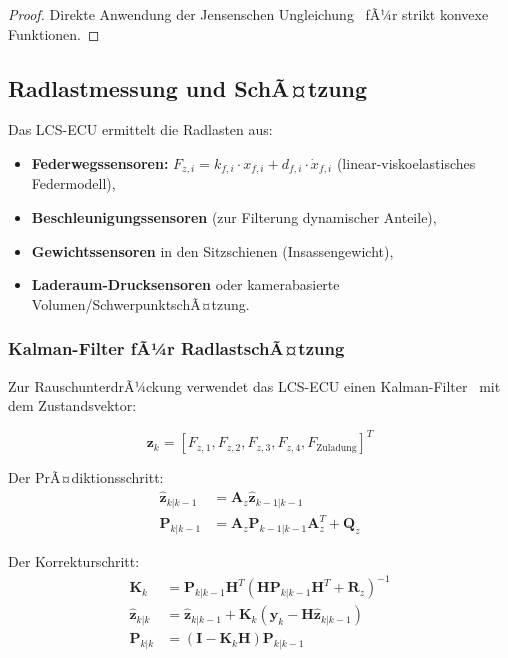 ﻿\documentclass[12pt,a4paper]{article}
\theoremstyle{definition}
\theoremstyle{remark}
\begin{document}
\begin{proof}
Direkte Anwendung der Jensenschen Ungleichung~\cite{Jensen1906} fÃ¼r strikt
konvexe Funktionen.
\end{proof}

\subsection{Radlastmessung und SchÃ¤tzung}

Das LCS-ECU ermittelt die Radlasten aus:
\begin{itemize}
  \item \textbf{Federwegssensoren:} $F_{z,i} = k_{f,i} \cdot x_{f,i} + d_{f,i} \cdot \dot{x}_{f,i}$
        (linear-viskoelastisches Federmodell),
  \item \textbf{Beschleunigungssensoren} (zur Filterung dynamischer Anteile),
  \item \textbf{Gewichtssensoren} in den Sitzschienen (Insassengewicht),
  \item \textbf{Laderaum-Drucksensoren} oder kamerabasierte Volumen/SchwerpunktschÃ¤tzung.
\end{itemize}

\subsubsection{Kalman-Filter fÃ¼r RadlastschÃ¤tzung}

Zur RauschunterdrÃ¼ckung verwendet das LCS-ECU einen Kalman-Filter~\cite{Kalman1960}
mit dem Zustandsvektor:

\begin{equation}
  \mathbf{z}_k = \left[F_{z,1}, F_{z,2}, F_{z,3}, F_{z,4}, F_{\mathrm{Zuladung}}\right]^T
\end{equation}

Der PrÃ¤diktionsschritt:
\begin{align}
  \hat{\mathbf{z}}_{k|k-1} &= \mathbf{A}_z \hat{\mathbf{z}}_{k-1|k-1}\\
  \mathbf{P}_{k|k-1} &= \mathbf{A}_z \mathbf{P}_{k-1|k-1} \mathbf{A}_z^T + \mathbf{Q}_z
\end{align}

Der Korrekturschritt:
\begin{align}
  \mathbf{K}_k &= \mathbf{P}_{k|k-1}\mathbf{H}^T
    (\mathbf{H}\mathbf{P}_{k|k-1}\mathbf{H}^T + \mathbf{R}_z)^{-1}\\
  \hat{\mathbf{z}}_{k|k} &= \hat{\mathbf{z}}_{k|k-1} + \mathbf{K}_k
    (\mathbf{y}_k - \mathbf{H}\hat{\mathbf{z}}_{k|k-1})\\
  \mathbf{P}_{k|k} &= (\mathbf{I} - \mathbf{K}_k \mathbf{H})\mathbf{P}_{k|k-1}
\end{align}
\end{document}
